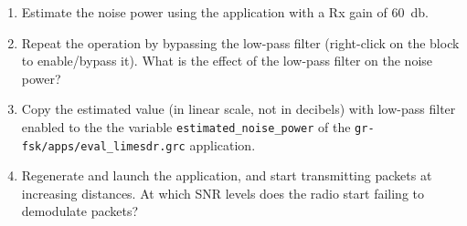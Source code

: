 \begin{enumerate}
    \item Estimate the noise power using the application with a Rx gain of \SI{60}{\decibel}.
    \item Repeat the operation by bypassing the low-pass filter (right-click on the block to enable/bypass it).
    What is the effect of the low-pass filter on the noise power?
    \item Copy the estimated value (in linear scale, not in decibels)
    with low-pass filter enabled to the the variable \texttt{estimated\_noise\_power} of the \texttt{gr-fsk/apps/eval\_limesdr.grc} application.
    \item Regenerate and launch the application, and start transmitting packets at increasing distances.
    At which SNR levels does the radio start failing to demodulate packets?
\end{enumerate}
